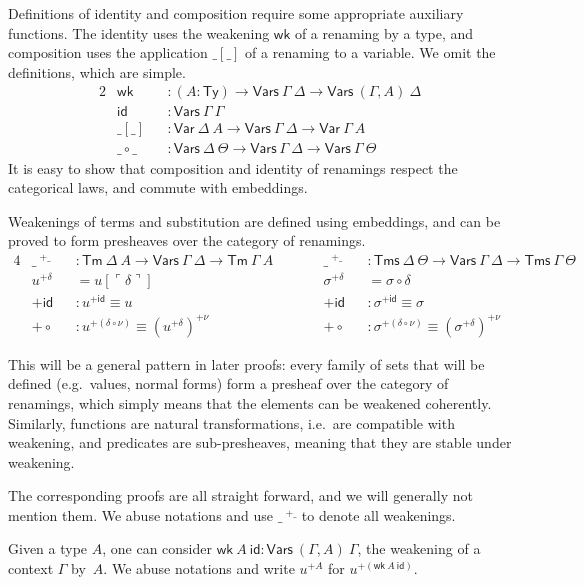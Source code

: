 \documentclass[a4paper,english,cleveref,autoref,draft]{lipics-v2019}
\newcommand{\agdaSymb}[1]{\mathsf{#1}}
\newcommand{\Ty}{\agdaSymb{Ty}}
\newcommand{\Tms}{\agdaSymb{Tms}}
\newcommand{\Tm}{\agdaSymb{Tm}}
\newcommand{\id}{\agdaSymb{id}}
\newcommand{\Var}{\agdaSymb{Var}}
\newcommand{\Vars}{\agdaSymb{Vars}}
\newcommand{\wk}{\agdaSymb{wk}}
\newcommand{\cul}{\ulcorner}
\newcommand{\cur}{\urcorner}
\begin{document}
Definitions of identity and composition require some appropriate auxiliary
functions. The identity uses the weakening $\wk$ of a renaming by a type,
and composition uses the application $\_[\_]$ of a renaming to a variable.
We omit the definitions, which are simple.
\begin{alignat*}{2}
  & \wk && : (A : \Ty) \to \Vars\ \Gamma\ \Delta \to \Vars\ (\Gamma,A)\ \Delta \\
  & \id && : \Vars\ \Gamma\ \Gamma \\
  & \_[\_] && : \Var\ \Delta\ A \to \Vars\ \Gamma\ \Delta \to \Var\ \Gamma\ A \\
  & \_\circ\_ && : \Vars\ \Delta\ \Theta \to \Vars\ \Gamma\ \Delta \to \Vars\ \Gamma\ \Theta
\end{alignat*}
It is easy to show that composition and identity of renamings respect
the categorical laws, and commute with embeddings.

Weakenings of terms and substitution are defined using embeddings,
and can be proved to form presheaves over the category of renamings.
\begin{alignat*}{4}
  & \_\ ^{+\_} && : \Tm\ \Delta\ A \to \Vars\ \Gamma\ \Delta \to \Tm\ \Gamma\ A \qquad
  && \_\ ^{+\_} && : \Tms\ \Delta\ \Theta \to \Vars\ \Gamma\ \Delta \to \Tms\ \Gamma\ \Theta \\
  & u^{+\delta} && = u [\cul\delta\cur]
  && \sigma^{+\delta} && = \sigma \circ \delta \\
  & +\id && : u^{+\id} \equiv u
  && +\id && : \sigma^{+\id} \equiv \sigma \\
  & +\circ && : u^{+ (\delta \circ \nu)} \equiv (u^{+\delta})^{+\nu}
  && +\circ && : \sigma^{+ (\delta \circ \nu)} \equiv (\sigma^{+\delta})^{+\nu}
\end{alignat*}

This will be a general pattern in later proofs: every family of sets that will
be defined (e.g.\ values, normal forms) form a presheaf over the category of
renamings, which simply means that the elements can be weakened coherently.
Similarly, functions are natural transformations, i.e.\ are compatible
with weakening, and predicates are sub-presheaves, meaning that they are stable
under weakening.

The corresponding proofs are all straight forward, and we will generally not
mention them. We abuse notations and use $\_\ ^{+\_}$ to denote all weakenings.

Given a type $A$, one can consider $\wk\ A\ \id : \Vars\ (\Gamma,A)\ \Gamma$,
the weakening of a context $\Gamma$ by~$A$.
We abuse notations and write $u^{+A}$ for $u^{+ (\wk\ A\ \id)}$.
\end{document}
